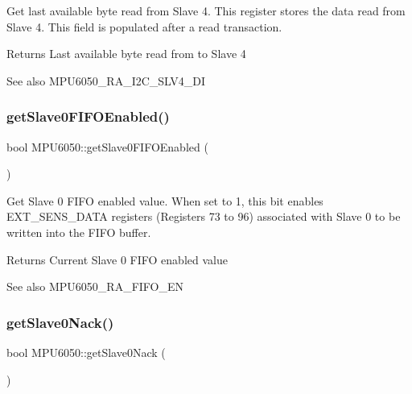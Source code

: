 Get last available byte read from Slave 4. This register stores the data read from Slave 4. This field is populated after a read transaction. \begin{DoxyReturn}{Returns}
Last available byte read from to Slave 4 
\end{DoxyReturn}
\begin{DoxySeeAlso}{See also}
M\+P\+U6050\+\_\+\+R\+A\+\_\+\+I2\+C\+\_\+\+S\+L\+V4\+\_\+\+DI 
\end{DoxySeeAlso}
\mbox{\label{class_m_p_u6050_a6aa7aa2e3fac06f8b5ab9ee127255a5e}} 
\subsubsection{\texorpdfstring{getSlave0FIFOEnabled()}{getSlave0FIFOEnabled()}}
{\footnotesize\ttfamily bool M\+P\+U6050\+::get\+Slave0\+F\+I\+F\+O\+Enabled (\begin{DoxyParamCaption}{ }\end{DoxyParamCaption})}

Get Slave 0 F\+I\+FO enabled value. When set to 1, this bit enables E\+X\+T\+\_\+\+S\+E\+N\+S\+\_\+\+D\+A\+TA registers (Registers 73 to 96) associated with Slave 0 to be written into the F\+I\+FO buffer. \begin{DoxyReturn}{Returns}
Current Slave 0 F\+I\+FO enabled value 
\end{DoxyReturn}
\begin{DoxySeeAlso}{See also}
M\+P\+U6050\+\_\+\+R\+A\+\_\+\+F\+I\+F\+O\+\_\+\+EN 
\end{DoxySeeAlso}
\mbox{\label{class_m_p_u6050_a74511edfcada3fb21c3327a0c846c72a}} 
\subsubsection{\texorpdfstring{getSlave0Nack()}{getSlave0Nack()}}
{\footnotesize\ttfamily bool M\+P\+U6050\+::get\+Slave0\+Nack (\begin{DoxyParamCaption}{ }\end{DoxyParamCaption})}

